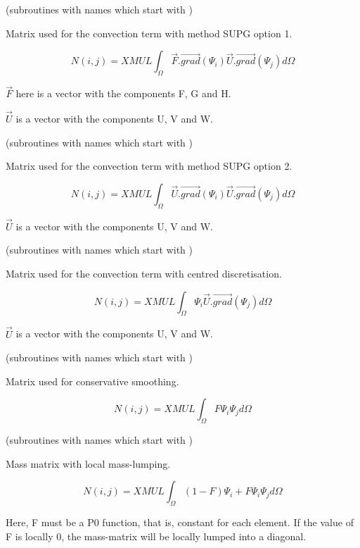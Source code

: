 (subroutines with names which start with )

Matrix used for the convection term with method SUPG option 1.

\[N(i,j)=XMUL
\int _{\Omega }
\vec{F} . \overrightarrow{grad} (\Psi _{i} )
\vec{U} . \overrightarrow{grad} (\Psi _{j} )
d\Omega
\]

$\vec{F}$ here is a vector with the components F, G and H.

$\vec{U}$ is a vector with the components U, V and W.


(subroutines with names which start with )

Matrix used for the convection term with method SUPG option 2.

\[N(i,j)=XMUL
\int _{\Omega }
\vec{U} . \overrightarrow{grad} (\Psi _{i} )
\vec{U} . \overrightarrow{grad} (\Psi _{j} )
d\Omega
\]

$\vec{U}$ is a vector with the components U, V and W.


(subroutines with names which start with )

Matrix used for the convection term with centred discretisation.

\[
N(i,j)=XMUL \int _{\Omega }
\Psi _{i} \vec{U} . \overrightarrow{grad} (\Psi _{j} )
d\Omega
\]

$\vec{U}$ is a vector with the components U, V and W.


(subroutines with names which start with )

Matrix used for conservative smoothing.

\[N(i,j)=XMUL \int _{\Omega }F \Psi _{i} \Psi _{j} d\Omega  \]


(subroutines with names which start with )

Mass matrix with local mass-lumping.

\[N(i,j)=XMUL \int _{\Omega }(1-F) \Psi _{i} +F\Psi _{i} \Psi _{j} d\Omega  \]

Here, F must be a P0 function, that is, constant for each element. If the value
of F is locally 0, the mass-matrix will be locally lumped into a diagonal.


